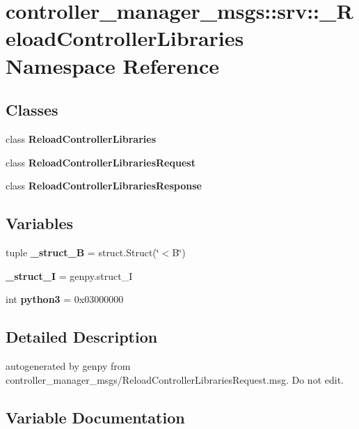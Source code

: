 \section{controller\-\_\-manager\-\_\-msgs\-:\-:srv\-:\-:\-\_\-\-Reload\-Controller\-Libraries \-Namespace \-Reference}
\label{namespacecontroller__manager__msgs_1_1srv_1_1__ReloadControllerLibraries}
\subsection*{\-Classes}
\begin{DoxyCompactItemize}
\item 
class {\bf \-Reload\-Controller\-Libraries}
\item 
class {\bf \-Reload\-Controller\-Libraries\-Request}
\item 
class {\bf \-Reload\-Controller\-Libraries\-Response}
\end{DoxyCompactItemize}
\subsection*{\-Variables}
\begin{DoxyCompactItemize}
\item 
tuple {\bf \-\_\-struct\-\_\-\-B} = struct.\-Struct(\char`\"{}$<$\-B\char`\"{})
\item 
{\bf \-\_\-struct\-\_\-\-I} = genpy.\-struct\-\_\-\-I
\item 
int {\bf python3} = 0x03000000
\end{DoxyCompactItemize}


\subsection{\-Detailed \-Description}
\begin{DoxyVerb}autogenerated by genpy from controller_manager_msgs/ReloadControllerLibrariesRequest.msg. Do not edit.\end{DoxyVerb}
 

\subsection{\-Variable \-Documentation}
